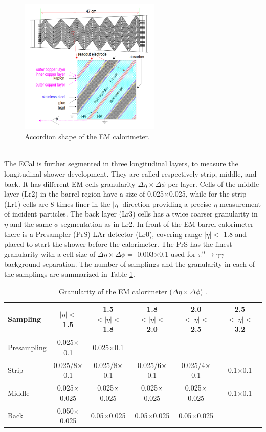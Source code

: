 \begin{figure}[htbp]
    \centering
    \includegraphics[width=0.6\textwidth]{Ch2/Img/ECal_accord.png}
    \caption{Accordion shape of the EM calorimeter.}
    \label{fig:chap2:ATLAS:Calo:ECal:Acc}
\end{figure}
\\
The ECal is further segmented in three longitudinal layers, to measure the longitudinal shower development. They are called respectively strip, middle, and back. It has different EM cells granularity $\Delta\eta\times\Delta\phi$ per layer. Cells of the middle layer (Lr2) in the barrel region have a size of 0.025$\times$0.025, while for the strip (Lr1) cells are 8 times finer in the $|\eta|$ direction providing a precise $\eta$ measurement of incident particles. The back layer (Lr3) cells has a twice coarser granularity in $\eta$ and the same $\phi$ segmentation as in Lr2. In front of the EM barrel calorimeter there is a Presampler (PrS) LAr detector (Lr0), covering range $|\eta| < $ 1.8 and placed to start the shower before the calorimeter. The PrS has the finest granularity with a cell size of $\Delta\eta\times\Delta\phi =$  0.003$\times$0.1 used for $\pi^0\rightarrow\gamma\gamma$ background separation. The number of samplings  and the granularity in each of the samplings are summarized in Table \ref{tab:chap2:ATLAS:Calo:ECal:Gr}. \\
\begin{table}[htbp]
    \centering
    \begin{tabular}{lccccc}
    \hline\hline
    Sampling & $|\eta| < $ 1.5 & 1.5 $ < |\eta| < $ 1.8 & 1.8 $ < |\eta| < $ 2.0 & 2.0 $ < |\eta| < $ 2.5 & 2.5 $ < |\eta| < $ 3.2 \\
    \hline
        Presampling & 0.025$\times$0.1 & 0.025$\times$0.1  \\
        Strip & 0.025/8$\times$0.1 & 0.025/8$\times$0.1 & 0.025/6$\times$0.1 & 0.025/4$\times$0.1 & 0.1$\times$0.1 \\
        Middle & 0.025$\times$0.025 & 0.025$\times$0.025 & 0.025$\times$0.025 & 0.025$\times$0.025 & 0.1$\times$0.1 \\
        Back & 0.050$\times$0.025 & 0.05$\times$0.025 & 0.05$\times$0.025 & 0.05$\times$0.025 \\
    \hline\hline
    \end{tabular}
    \caption{Granularity of the EM calorimeter ($\Delta\eta\times\Delta\phi$) \cite{LAr_TRD}.}
    \label{tab:chap2:ATLAS:Calo:ECal:Gr}
\end{table}
